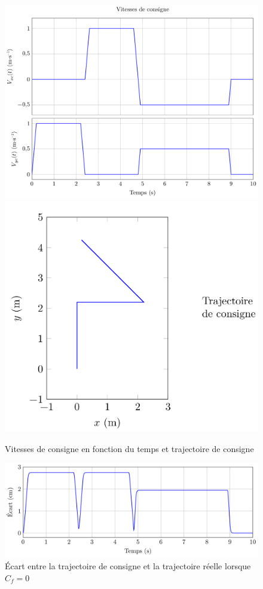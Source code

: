 \begin{figure}[!ht]
\begin{center}
 \includegraphics[width=0.8\linewidth]{img/fig21_1.png} \\
 \includegraphics[width=0.4\linewidth]{img/fig21_2.png}
 \end{center}
  \caption{Vitesses de consigne en fonction du temps et trajectoire de consigne}
\label{fig21}
\end{figure}

\begin{figure}[!ht]
\begin{center}
 \includegraphics[width=0.8\linewidth]{img/fig22.png}
 \end{center}
  \caption{Écart entre la trajectoire de consigne et la trajectoire réelle lorsque $C_f=0$}
\label{fig22}
\end{figure}

